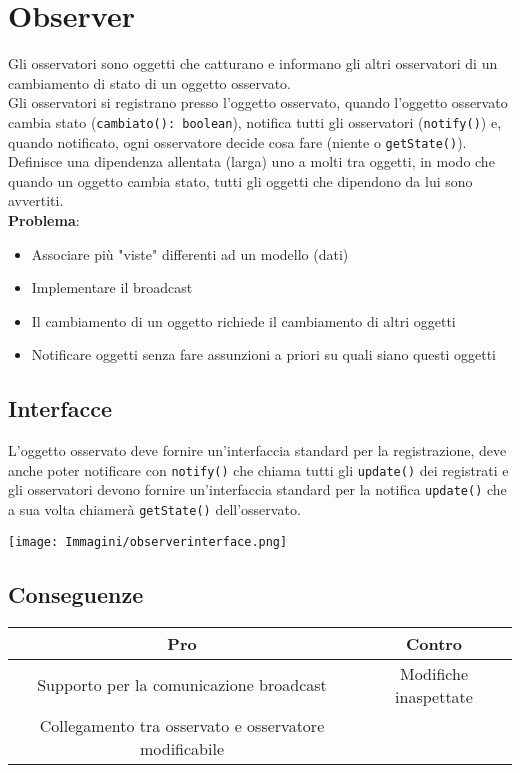 \documentclass[12pt, a4paper]{report}
\begin{document}
\section{Observer}
Gli osservatori sono oggetti che catturano e informano gli altri osservatori di un cambiamento di stato di un oggetto osservato.\\
Gli osservatori si registrano presso l'oggetto osservato, quando l'oggetto osservato cambia stato (\texttt{cambiato(): boolean}), notifica tutti gli osservatori (\texttt{notify()}) e, quando notificato, ogni osservatore decide cosa fare (niente o \texttt{getState()}).\\
Definisce una dipendenza allentata (larga) uno a molti tra oggetti, in modo che quando un oggetto cambia stato, tutti gli oggetti che dipendono da lui sono avvertiti.\\
\textbf{Problema}:
\begin{itemize}
    \item Associare più "viste" differenti ad un  modello (dati)
    \item Implementare il broadcast
    \item Il cambiamento di un oggetto richiede il cambiamento di altri oggetti
    \item Notificare oggetti senza fare assunzioni a priori su quali siano questi oggetti
\end{itemize}
\subsection{Interfacce}
L'oggetto osservato deve fornire un'interfaccia standard per la registrazione, deve anche poter notificare  con \texttt{notify()} che chiama tutti gli \texttt{update()} dei registrati  e gli osservatori devono fornire un'interfaccia standard per la notifica \texttt{update()} che a sua volta chiamerà \texttt{getState()} dell'osservato.
\begin{center}
    \texttt{[image: Immagini/observerinterface.png]}
\end{center}
\subsection{Conseguenze}
\begin{center}
    \begin{tabular}{| c | c |}
        \hline
        \textbf{Pro} & \textbf{Contro} \\
        \hline
        Supporto per la comunicazione broadcast & Modifiche inaspettate \\
        \hline
        Collegamento tra osservato e osservatore modificabile & \\
        \hline
    \end{tabular}
\end{center}
\end{document}

